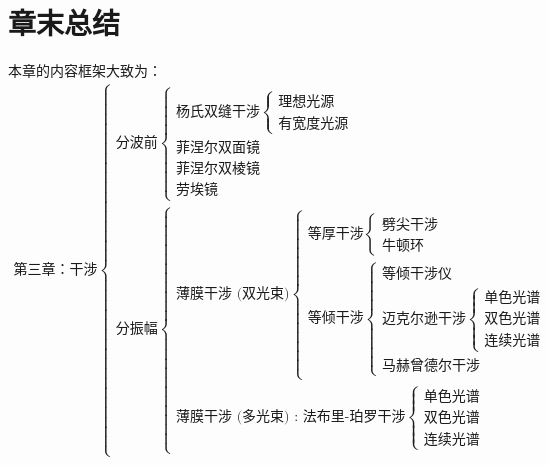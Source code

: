 \documentclass[UTF8]{report}
\theoremstyle{MyLineTheoremStyle} %
\theoremstyle{MyBlockTheoremStyle} %
\theoremstyle{MySubsubsectionStyle} %
\begin{document}
\section{章末总结}
本章的内容框架大致为：
\begin{gather*}
\text{第三章：干涉}
\begin{cases}
    \text{分波前}
        \begin{cases}
            \text{杨氏双缝干涉} 
                \begin{cases}
                    \text{理想光源} \\ 
                    \text{有宽度光源}
                \end{cases}
            \\ \text{菲涅尔双面镜} \\ 
            \text{菲涅尔双棱镜} \\ 
            \text{劳埃镜}
        \end{cases} 
    \\\text{分振幅} 
        \begin{cases}
            \text{薄膜干涉 (双光束)} 
                \begin{cases}
                    \text{等厚干涉} 
                        \begin{cases}
                            \text{劈尖干涉}\\
                            \text{牛顿环}
                        \end{cases}
                    \\ \text{等倾干涉} 
                        \begin{cases}
                            \text{等倾干涉仪} \\ 
                            \text{迈克尔逊干涉} 
                                \begin{cases}
                                    \text{单色光谱} \\ 
                                    \text{双色光谱} \\ 
                                    \text{连续光谱}
                                \end{cases}
                            \\\text{马赫曾德尔干涉}
                        \end{cases}
                \end{cases}
            \\ \text{薄膜干涉 (多光束) : }\text{法布里-珀罗干涉}
            \begin{cases}
                \text{单色光谱} \\ 
                \text{双色光谱} \\ 
                \text{连续光谱}
            \end{cases}
        \end{cases}
\end{cases}
\end{gather*}
\end{document}
